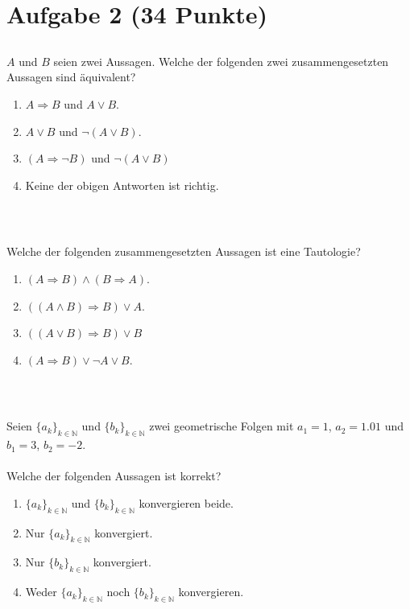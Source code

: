 \section*{Aufgabe 2 (34 Punkte)}
\vspace{0.4cm}

\subsection*{}
$ A $ und $ B $ seien zwei Aussagen. Welche der folgenden zwei zusammengesetzten Aussagen sind äquivalent? 
 \renewcommand{\labelenumi}{(\alph{enumi})}
\begin{enumerate}
\item $ A \Rightarrow  B $ und $A \vee B$.
\item $ A \vee B $ und $\neg (A \vee B)$.
\item $ (A \Rightarrow \neg B) $ und $\neg ( A \vee B )$
\item Keine der obigen Antworten ist richtig.
\end{enumerate}
\ \\
\subsection*{}
Welche der folgenden zusammengesetzten Aussagen ist eine Tautologie? 
\renewcommand{\labelenumi}{(\alph{enumi})}
\begin{enumerate}
	\item $(A \Rightarrow B ) \wedge (B \Rightarrow A)$.
	\item $ ((A \wedge B) \Rightarrow B) \vee A$.
	\item $ ((A \vee B) \Rightarrow B) \vee B$
	\item $(A \Rightarrow B ) \vee \neg A \vee B$.
\end{enumerate}
\ \\
\subsection*{}
Seien $\{a_k\}_{k \in \mathbb{N}}$ und $\{b_k\}_{k \in \mathbb{N}}$ zwei geometrische Folgen mit $a_1 = 1$, $a_2= 1.01$ und $b_1 = 3$, $b_2 = -2$.\\
\\
Welche der folgenden Aussagen ist korrekt? 
\renewcommand{\labelenumi}{(\alph{enumi})}
\begin{enumerate}
\item 
$\{a_k\}_{k \in \mathbb{N}}$ und $\{b_k\}_{k \in \mathbb{N}}$ konvergieren beide.
\item 
Nur $\{a_k\}_{k \in \mathbb{N}}$ konvergiert.
\item 
Nur $\{b_k\}_{k \in \mathbb{N}}$ konvergiert.
\item
Weder $\{a_k\}_{k \in \mathbb{N}}$ noch $\{b_k\}_{k \in \mathbb{N}}$ konvergieren.
\end{enumerate}
\ \\
